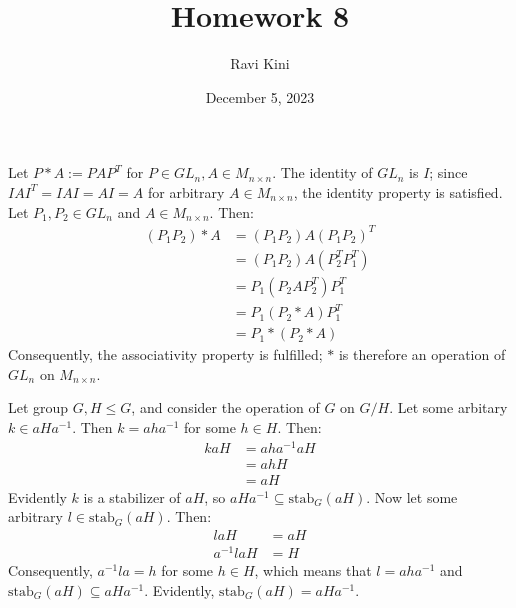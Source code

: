 \documentclass{article}
\title{Homework 8}
\author{Ravi Kini}
\date{December 5, 2023}
\begin{document}
\maketitle

Let $P * A := PAP^T$ for $P \in GL_n, A \in M_{n\times n}$. The identity of $GL_n$ is $I$; since $IAI^T = IAI = AI = A$ for arbitrary $A \in M_{n \times n}$, the identity property is satisfied. Let $P_1, P_2 \in GL_n$ and $A \in M_{n \times n}$. Then:
\begin{equation}
    \begin{split}
        \left(P_1P_2\right) * A & = \left(P_1P_2\right)A\left(P_1P_2\right)^T \\
        & = \left(P_1P_2\right)A\left(P_2^TP_1^T\right) \\
        & = P_1\left(P_2AP_2^T\right)P_1^T \\
        & = P_1\left(P_2 * A\right)P_1^T \\
        & = P_1 * \left(P_2 * A\right)
    \end{split}
\end{equation}
Consequently, the associativity property is fulfilled; $*$ is therefore an operation of $GL_n$ on $M_{n \times n}$. 

\clearpage

Let group $G, H \leq G$, and consider the operation of $G$ on $G/H$. Let some arbitary $k \in aHa^{-1}$. Then $k = aha^{-1}$ for some $h \in H$. Then:
\begin{equation}
    \begin{split}
        kaH & = aha^{-1}aH \\
        & = ahH \\
        & = aH
    \end{split}
\end{equation}
Evidently $k$ is a stabilizer of $aH$, so $aHa^{-1} \subseteq \mathrm{stab}_G\left(aH\right)$. Now let some arbitrary $l \in \mathrm{stab}_G\left(aH\right)$. Then:
\begin{equation}
    \begin{split}
        laH & = aH \\
        a^{-1}laH & = H
    \end{split}
\end{equation}
Consequently, $a^{-1}la = h$ for some $h \in H$, which means that $l = aha^{-1}$ and $\mathrm{stab}_G\left(aH\right) \subseteq aHa^{-1}$. Evidently, $\mathrm{stab}_G\left(aH\right) = aHa^{-1}$.
\end{document}

